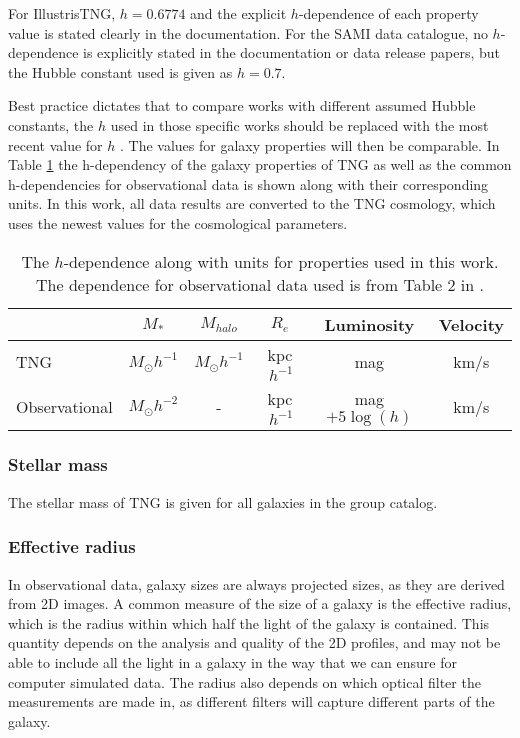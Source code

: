 For IllustrisTNG, $h=0.6774$ and the explicit $h$-dependence of each property value is stated clearly in the documentation. For the SAMI data catalogue, no $h$-dependence is explicitly stated in the documentation or data release papers, but the Hubble constant used is given as $h = 0.7$.

Best practice dictates that to compare works with different assumed Hubble constants, the $h$ used in those specific works should be replaced with the most recent value for $h$ \parencite{Croton2013}. The values for galaxy properties will then be comparable. In Table \ref{h_dependence} the h-dependency of the galaxy properties of TNG as well as the common h-dependencies for observational data is shown along with their corresponding units. In this work, all data results are converted to the TNG cosmology, which uses the newest values for the cosmological parameters.

\begin{table}
\begin{center}
\caption{The $h$-dependence along with units for properties used in this work. The dependence for observational data used is from Table 2 in \textcite{Croton2013}.}
\label{h_dependence}
\begin{tabular}{ l| c c c c c }
 \hline
 \hline
   & $M_*$ & $M_{halo}$ & $R_e$ & Luminosity & Velocity \\
 \hline
 TNG & $M_{\odot}h^{-1}$ & $M_{\odot}h^{-1}$ & kpc$\,h^{-1}$ & mag & km/s \\ 
 Observational & $M_{\odot}h^{-2}$ & - & kpc$\,h^{-1}$ & mag $+5\log(h)$ & km/s \\
 \hline 
\end{tabular}
\end{center}
\end{table}


\subsubsection{Stellar mass}
The stellar mass of TNG is given for all galaxies in the group catalog.

\subsubsection{Effective radius}
In observational data, galaxy sizes are always projected sizes, as they are derived from 2D images. A common measure of the size of a galaxy is the effective radius, which is the radius within which half the light of the galaxy is contained. This quantity depends on the analysis and quality of the 2D profiles, and may not be able to include all the light in a galaxy in the way that we can ensure for computer simulated data. The radius also depends on which optical filter the measurements are made in, as different filters will capture different parts of the galaxy.

